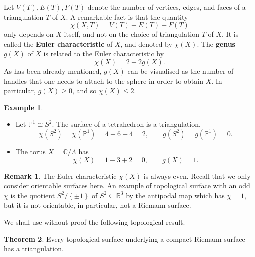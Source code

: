 \documentclass{article}
\newcommand{\R}{\mathbb{R}}
\newcommand{\C}{\mathbb{C}}
\renewcommand{\P}{\mathbb{P}}
\newcommand{\rb}[1]{\left( #1 \right)}
\newcommand{\cb}[1]{\left\{ #1 \right\}}
\theoremstyle{definition}\newtheorem{definition}{Definition}[section]
\theoremstyle{definition}\newtheorem{notation}[definition]{Notation}
\theoremstyle{definition}\newtheorem{remark}[definition]{Remark}
\theoremstyle{definition}\newtheorem{example1}[definition]{Example}
\theoremstyle{definition}\newtheorem{fact}{Fact}
\theoremstyle{definition}\newtheorem{exercise}{Exercise}
\theoremstyle{definition}\newtheorem*{example2}{Example}
\newtheorem{theorem}[definition]{Theorem}
\begin{document}
Let $ V\rb{T}, E\rb{T}, F\rb{T} $ denote the number of vertices, edges, and faces of a triangulation $ T $ of $ X $. A remarkable fact is that the quantity
$$ \chi\rb{X, T} = V\rb{T} - E\rb{T} + F\rb{T} $$
only depends on $ X $ itself, and not on the choice of triangulation $ T $ of $ X $. It is called the \textbf{Euler characteristic} of $ X $, and denoted by $ \chi\rb{X} $. The \textbf{genus} $ g\rb{X} $ of $ X $ is related to the Euler characteristic by
$$ \chi\rb{X} = 2 - 2g\rb{X}. $$
As has been already mentioned, $ g\rb{X} $ can be visualised as the number of handles that one needs to attach to the sphere in order to obtain $ X $. In particular, $ g\rb{X} \ge 0 $, and so $ \chi\rb{X} \le 2 $.

\begin{example2}
\hfill
\begin{itemize}
\item Let $ \P^1 \cong S^2 $. The surface of a tetrahedron is a triangulation.
$$ \chi\rb{S^2} = \chi\rb{\P^1} = 4 - 6 + 4 = 2, \qquad g\rb{S^2} = g\rb{\P^1} = 0. $$
\item The torus $ X = \C / \Lambda $ has
$$ \chi\rb{X} = 1 - 3 + 2 = 0, \qquad g\rb{X} = 1. $$
\end{itemize}
\end{example2}

\begin{remark}
The Euler characteristic $ \chi\rb{X} $ is always even. Recall that we only consider orientable surfaces here. An example of topological surface with an odd $ \chi $ is the quotient $ S^2 / \cb{\pm 1} $ of $ S^2 \subseteq \R^3 $ by the antipodal map which has $ \chi = 1 $, but it is not orientable, in particular, not a Riemann surface.
\end{remark}

We shall use without proof the following topological result.

\begin{theorem}
Every topological surface underlying a compact Riemann surface has a triangulation.
\end{theorem}

\end{document}
